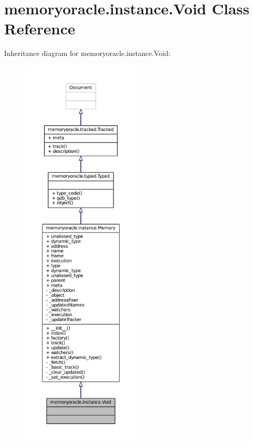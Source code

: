 \hypertarget{classmemoryoracle_1_1instance_1_1Void}{}\section{memoryoracle.\+instance.\+Void Class Reference}
\label{classmemoryoracle_1_1instance_1_1Void}


Inheritance diagram for memoryoracle.\+instance.\+Void\+:
\nopagebreak
\begin{figure}[H]
\begin{center}
\leavevmode
\includegraphics[height=550pt]{classmemoryoracle_1_1instance_1_1Void__inherit__graph}
\end{center}
\end{figure}


